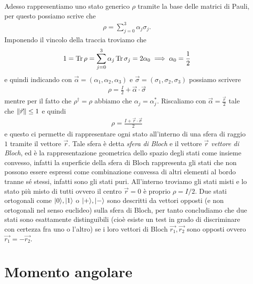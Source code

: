 Adesso rappresentiamo uno stato generico $ \rho $ tramite la base delle matrici di Pauli, per questo possiamo scrive che 
\begin{align*}
  \rho = \sum_{j = 0}^3 \alpha_j \sigma_j.
\end{align*}
Imponendo il vincolo della traccia troviamo che 
\begin{align*}
  1 = \operatorname{\textnormal{Tr}} \rho = \sum_{j = 0}^3 \alpha_j \operatorname{\textnormal{Tr}} \sigma_j = 2 \alpha_0  \implies \alpha_0 = \frac12
\end{align*}
e quindi indicando con $ \vec{\alpha} = (\alpha_1, \alpha_2, \alpha_3) $ e $ \vec{\sigma} = (\sigma_1, \sigma_2, \sigma_3) $ possiamo scrivere
\begin{align*}
  \rho = \frac{I}2 + \vec{\alpha} \cdot \vec{\sigma}
\end{align*}
mentre per il fatto che $ \rho^\dag = \rho $ abbiamo che $ \alpha_j = \alpha_j^* $. Riscaliamo con $ \vec{\alpha} = \frac{\vec{r}}2 $ 
tale che $ \left\lVert \vec{r} \right\rVert \leq 1 $ e quindi 
\begin{align*}
  \rho = \frac{I + \vec{r} \cdot \vec{\sigma}}2
\end{align*}
e questo ci permette di rappresentare ogni stato all'interno di una sfera di raggio $ 1 $ tramite il vettore $ \vec{r} $. Tale sfera è detta 
\textit{sfera di Bloch} e il vettore $ \vec{r} $ \textit{vettore di Bloch}, ed è la rappresentazione geometrica dello spazio degli stati come 
insieme convesso, infatti la superficie della sfera di Bloch rappresenta gli stati che non possono essere espressi come combinazione convessa di 
altri elementi al bordo tranne sé stessi, infatti sono gli stati puri. All'interno troviamo gli stati misti e lo stato più misto di tutti ovvero 
il centro $ \vec{r} = 0 $ è proprio $ \rho = I/2 $. Due stati ortogonali come $ \vert 0 \rangle, \vert 1 \rangle $ o $ \vert + \rangle, \vert - \rangle $ sono descritti da vettori opposti 
(e non ortogonali nel senso euclideo) sulla sfera di Bloch, per tanto concludiamo che due stati sono esattamente distinguibili (cioè esiste un 
test in grado di discriminare con certezza fra uno o l'altro) se i loro vettori di Bloch $ \vec{r_1}, \vec{r_2} $ sono opposti ovvero 
$ \vec{r_1} = - \vec{r_2}$.


\chapter{Momento angolare}


